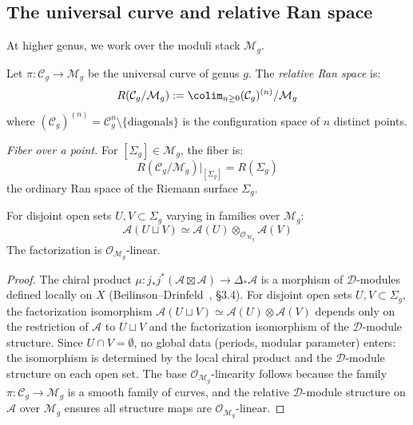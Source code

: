 \subsection{The universal curve and relative Ran space}
\label{subsec:universal-curve-ran}

At higher genus, we work over the moduli stack $\mathcal{M}_g$.

\begin{construction}\label{const:relative-ran}
Let $\pi: \mathcal{C}_g \to \mathcal{M}_g$ be the universal curve of genus $g$. The \emph{relative Ran space} is:
\[R(\mathcal{C}_g/\mathcal{M}_g) := \colim_{n \geq 0} (\mathcal{C}_g)^{(n)}/\mathcal{M}_g\]
where $(\mathcal{C}_g)^{(n)} = \mathcal{C}_g^n \setminus \{\text{diagonals}\}$ is the configuration space of $n$ distinct points.

\emph{Fiber over a point.} For $[\Sigma_g] \in \mathcal{M}_g$, the fiber is:
\[R(\mathcal{C}_g/\mathcal{M}_g)|_{[\Sigma_g]} = R(\Sigma_g)\]
the ordinary Ran space of the Riemann surface $\Sigma_g$.
\end{construction}

\begin{proposition}\label{prop:factorization-over-moduli}
For disjoint open sets $U, V \subset \Sigma_g$ varying in families over $\mathcal{M}_g$:
\[\mathcal{A}(U \sqcup V) \simeq \mathcal{A}(U) \otimes_{\mathcal{O}_{\mathcal{M}_g}} \mathcal{A}(V)\]
The factorization is $\mathcal{O}_{\mathcal{M}_g}$-linear.
\end{proposition}

\begin{proof}
The chiral product $\mu\colon j_*j^*(\mathcal{A} \boxtimes \mathcal{A}) \to \Delta_*\mathcal{A}$ is a morphism of $\mathcal{D}$-modules defined locally on $X$ (Beilinson--Drinfeld~\cite{BD04}, \S3.4).  For disjoint open sets $U, V \subset \Sigma_g$, the factorization isomorphism $\mathcal{A}(U \sqcup V) \simeq \mathcal{A}(U) \otimes \mathcal{A}(V)$ depends only on the restriction of $\mathcal{A}$ to $U \sqcup V$ and the factorization isomorphism of the $\mathcal{D}$-module structure.  Since $U \cap V = \emptyset$, no global data (periods, modular parameter) enters: the isomorphism is determined by the local chiral product and the $\mathcal{D}$-module structure on each open set.  The base $\mathcal{O}_{\mathcal{M}_g}$-linearity follows because the family $\pi\colon \mathcal{C}_{g} \to \mathcal{M}_g$ is a smooth family of curves, and the relative $\mathcal{D}$-module structure on $\mathcal{A}$ over $\mathcal{M}_g$ ensures all structure maps are $\mathcal{O}_{\mathcal{M}_g}$-linear.
\end{proof}

